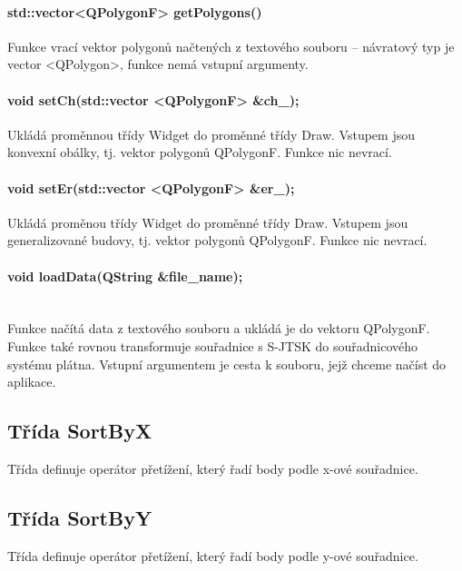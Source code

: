 \documentclass[11pt]{article}
\begin{document}
 	\paragraph{std::vector<QPolygonF> getPolygons()}
 	
 	Funkce vrací vektor polygonů načtených z textového souboru – návratový typ je vector <QPolygon>, funkce nemá vstupní argumenty.
 	
	\paragraph{void setCh(std::vector <QPolygonF> \&ch\_);}
	Ukládá proměnnou třídy Widget do proměnné třídy Draw. Vstupem jsou konvexní obálky, tj. vektor polygonů QPolygonF. Funkce nic nevrací.
	
	\paragraph{void setEr(std::vector <QPolygonF> \&er\_);                                                                                                                                                                                                                                                                             }
	Ukládá proměnou třídy Widget do proměnné třídy Draw. Vstupem jsou generalizované budovy, tj. vektor polygonů QPolygonF. Funkce nic nevrací.
 	
 	\paragraph{void loadData(QString \&file\_name);}\mbox{}\\
 	Funkce načítá data z textového souboru a ukládá je do vektoru QPolygonF. Funkce také rovnou transformuje souřadnice s S-JTSK do souřadnicového systému plátna. Vstupní argumentem je cesta k souboru, jejž chceme načíst do aplikace.   
 	
 	\subsection{Třída SortByX}
 	Třída definuje operátor přetížení, který řadí body podle x-ové souřadnice.
 	
 	\subsection{Třída SortByY}
 	Třída definuje operátor přetížení, který řadí body podle y-ové souřadnice.
 	
\end{document}
